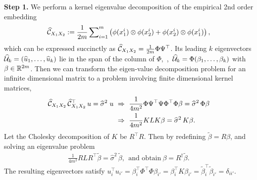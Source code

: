 \documentclass{article}
\begin{document}
{\bf Step 1.} We  perform a kernel eigenvalue decomposition of the empirical 2nd order embedding
$$
  \widehat {\mathcal{C}}_{X_1 X_2}:= \frac{1}{2m} \sum\nolimits_{i=1}^{m} \left(\phi(x_1^i) \otimes \phi(x_2^i) + \phi(x_2^i) \otimes \phi(x_1^i)\right),
$$
which can be expressed succinctly as $\widehat {\mathcal{C}}_{X_1 X_2} = \frac{1}{2m} \Phi \Psi^\top$.
Its leading $k$ eigenvectors $\widehat {\mathcal{U}}_k = (\widehat u_1,\ldots,\widehat u_k)$  lie in the span of the column of  $\Phi$,~\ie,~$\widehat {\mathcal{U}}_k = \Phi (\beta_1,\ldots,\beta_k)$ with $\beta \in \mathbb{R}^{2m}$. Then we can transform the eigen-value decomposition problem for an infinite dimensional matrix to a problem involving finite dimensional kernel matrices,
\begin{align*}
	\widehat {\mathcal{C}}_{X_1 X_2}\, \widehat {\mathcal{C}}_{X_1 X_2}^\top\, u = \widehat \sigma^2 \;u
	&~\Rightarrow~
	\frac{1}{4m^2}\Phi \Psi^\top \Psi \Phi^\top \Phi \beta = \widehat \sigma^2 \,\Phi \beta \\
	&~\Rightarrow~
	\frac{1}{4m^2} K L K \beta = \widehat \sigma^2 \,K \beta.
\end{align*}
\vspace{-1mm}
Let the Cholesky decomposition of $K$ be $R^\top R$. Then by redefining $\widetilde{\beta}=R\beta$, and solving an eigenvalue problem
\begin{align}
 \frac{1}{4m^2} R L R^\top \widetilde{\beta} =\widehat  \sigma^2 \, \widetilde{\beta},~~\text{and obtain}~\beta = R^{\dagger} \widetilde{\beta}.
\end{align}
The resulting eigenvectors satisfy $u_i^\top u_{i'} = \beta_i^\top \Phi^\top \Phi \beta_{i'} =  \beta_{i}^\top K  \beta_{i'} =  \widetilde{\beta}_{i}^\top \widetilde{\beta}_{i'}=\delta_{ii'}$.
\end{document}

